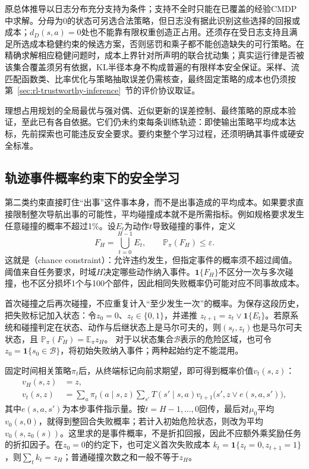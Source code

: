 原总体推导以日志分布充分支持为条件；支持不全时只能在已覆盖的经验CMDP中求解。分母为0的状态可另选合法策略，但日志没有据此识别这些选择的回报或成本；$d_D(s,a)=0$处也不能靠有限权重创造正占用。还须存在受日志支持且满足所选成本稳健约束的候选方案，否则惩罚和乘子都不能创造缺失的可行策略。在精确求解相应稳健问题时，成本上界针对所声明的联合扰动集；真实运行律是否被该集合覆盖须另有依据，KL半径本身不构成普遍的有限样本安全保证。采样、流匹配函数类、比率优化与策略抽取误差仍需核查，最终固定策略的成本也仍须按第~\ref{sec:rl-trustworthy-inference}~节的评价协议取证。

理想占用规划的全局最优与强对偶、近似更新的误差控制、最终策略的原成本验证，至此已有各自依据。它们仍未约束每条训练轨迹：即使输出策略平均成本达标，先前探索也可能违反安全要求。要约束整个学习过程，还须明确其事件或硬安全标准。

\subsection{轨迹事件概率约束下的安全学习}
\label{sec:rl-trustworthy-chance}

第二类约束直接盯住“出事”这件事本身，而不是出事造成的平均成本。如果要求直接限制整次导航出事的可能性，平均碰撞成本就不是所需指标。例如规格要求发生任意碰撞的概率不超过1\%。设$E_t$为动作$t$导致碰撞的事件，定义
\[
  F_H=\bigcup_{t=0}^{H-1}E_t,\qquad
  \mathbb P_\pi(F_H)\leq\varepsilon.
\]
这就是（chance constraint）：允许违约发生，但指定事件的概率须不超过阈值。阈值来自任务要求，时域$H$决定哪些动作纳入事件。$\mathbf1\{F_H\}$不区分一次与多次碰撞，也不区分损坏1个与100个部件，因此相同失败概率仍可能对应不同事故成本。

首次碰撞之后再次碰撞，不应重复计入“至少发生一次”的概率。为保存这段历史，把失败标记加入状态：令$z_0=0$、$z_t\in\{0,1\}$，并递推
$z_{t+1}=z_t\lor\mathbf1\{E_t\}$。若原系统和碰撞判定在状态、动作与后继状态上是马尔可夫的，则$(s_t,z_t)$也是马尔可夫状态，且
$\mathbb P_\pi(F_H)=\mathbb E_\pi z_H$。
对于以状态集合$\mathcal B$表示的危险区域，也可令$z_0=\mathbf1\{s_0\in\mathcal B\}$，将初始失败纳入事件；两种起始约定不能混用。

固定时间相关策略$\pi_t$后，从终端标记向前求期望，即可得到概率价值$v_t(s,z)$：
\begin{align}
  v_H(s,z)&=z,\nonumber\\
  v_t(s,z)&=\sum_a\pi_t(a\mid s,z)
       \sum_{s'}T(s'\mid s,a)
         v_{t+1}\bigl(s',z\lor e(s,a,s')\bigr),
  \label{eq:rl-trustworthy-probability-value}
\end{align}
其中$e(s,a,s')$为本步事件指示量。按$t=H-1,\ldots,0$回传，最后对$\mu_0$平均$v_0(s,0)$，就得到整回合失败概率；若计入初始危险状态，则改为平均$v_0(s,z_0(s))$。这里求的是事件概率，不是折扣回报，因此不应额外乘奖励任务的折扣因子。在$z_0=0$的约定下，也可定义首次失败成本
$k_t=\mathbf1\{z_t=0,z_{t+1}=1\}$，则$\sum_tk_t=z_H$；普通碰撞次数之和一般不等于$z_H$。

